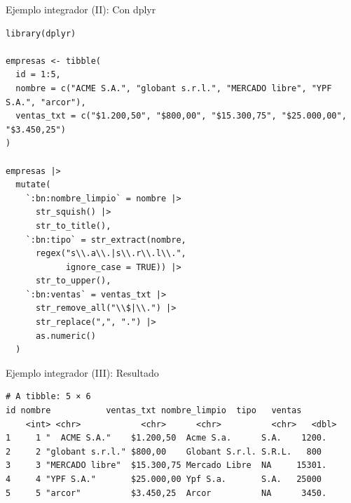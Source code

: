 \documentclass[8pt]{beamer}
\begin{document}
\begin{frame}[fragile]{Ejemplo integrador (II): Con dplyr}
\begin{lstlisting}[style=RScript, numbers=none]
library(dplyr)

empresas <- tibble(
  id = 1:5,
  nombre = c("ACME S.A.", "globant s.r.l.", "MERCADO libre", "YPF S.A.", "arcor"),
  ventas_txt = c("$1.200,50", "$800,00", "$15.300,75", "$25.000,00", "$3.450,25")
)

empresas |>
  mutate(
    `:bn:nombre_limpio` = nombre |>
      str_squish() |>
      str_to_title(),
    `:bn:tipo` = str_extract(nombre,
      regex("s\\.a\\.|s\\.r\\.l\\.",
            ignore_case = TRUE)) |>
      str_to_upper(),
    `:bn:ventas` = ventas_txt |>
      str_remove_all("\\$|\\.") |>
      str_replace(",", ".") |>
      as.numeric()
  )
\end{lstlisting}
\end{frame}




\begin{frame}[fragile]{Ejemplo integrador (III): Resultado}
\begin{lstlisting}[style=RConsole]
# A tibble: 5 × 6
id nombre           ventas_txt nombre_limpio  tipo   ventas
	<int> <chr>            <chr>      <chr>          <chr>   <dbl>
1     1 "  ACME S.A."    $1.200,50  Acme S.a.      S.A.    1200.
2     2 "globant s.r.l." $800,00    Globant S.r.l. S.R.L.   800 
3     3 "MERCADO libre"  $15.300,75 Mercado Libre  NA     15301.
4     4 "YPF S.A."       $25.000,00 Ypf S.a.       S.A.   25000 
5     5 "arcor"          $3.450,25  Arcor          NA      3450.
\end{lstlisting}
\end{frame}
\end{document}
